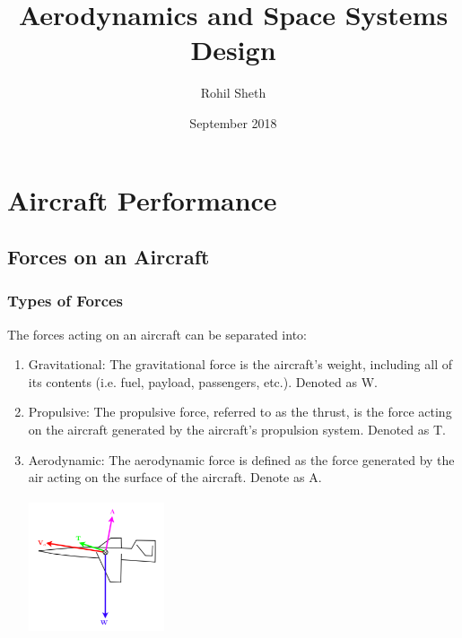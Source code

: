 \documentclass{article}
\title{Aerodynamics and Space Systems Design}
\author{Rohil Sheth}
\date{September 2018}
\begin{document}
    \maketitle
    \tableofcontents
    \section{Aircraft Performance}
    \subsection{Forces on an Aircraft}
    \subsubsection{Types of Forces}
    The forces acting on an aircraft can be separated into:
    \begin{enumerate}
        \item Gravitational: The gravitational force is the aircraft’s weight, including all of its contents (i.e.
        fuel, payload, passengers, etc.). Denoted as W.
        \item Propulsive: The propulsive force, referred to as the thrust, is the force acting on the aircraft
        generated by the aircraft’s propulsion system. Denoted as T.
        \item Aerodynamic: The aerodynamic force is defined as the force generated 
        by the air acting on the surface of the aircraft. Denote as A.
        
        \includegraphics[width=4cm, height=4cm]{forces}

    \end{enumerate}
\end{document}
